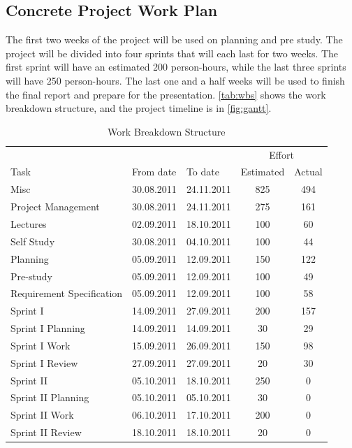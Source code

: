 \subsection{Concrete Project Work Plan}
The first two weeks of the project will be used on planning and pre study.
The project will be divided into four sprints that will each last for two weeks.
The first sprint will have an estimated 200 person-hours, while the last three
sprints will have 250 person-hours. The last one and a half weeks will be used to finish
the final report and prepare for the presentation. \autoref{tab:wbs} shows the
work breakdown structure, and the project timeline is in \autoref{fig:gantt}.

\begin{table}[!htb] \footnotesize \center
\caption{Work Breakdown Structure\label{tab:wbs}}
\begin{tabular}{l l l c c}
	\toprule
	& & & \multicolumn{2}{c}{Effort} \\
	\cmidrule(r){4-5}
	Task & From date & To date & Estimated & Actual  \\
	\midrule
	Misc & 30.08.2011 & 24.11.2011 & 825 & 494  \\
	\midrule
	Project Management & 30.08.2011 & 24.11.2011 & 275 &161 \\
	Lectures & 02.09.2011 & 18.10.2011 & 100 & 60 \\
	Self Study & 30.08.2011 & 04.10.2011 & 100 & 44 \\
	Planning & 05.09.2011 & 12.09.2011 & 150 & 122 \\
	Pre-study & 05.09.2011 & 12.09.2011 & 100 & 49 \\
	Requirement Specification & 05.09.2011 & 12.09.2011 & 100 & 58 \\
	\midrule
	Sprint I & 14.09.2011 & 27.09.2011 & 200 & 157 \\
	\midrule
	Sprint I Planning & 14.09.2011 & 14.09.2011 & 30 & 29 \\
	Sprint I Work & 15.09.2011 & 26.09.2011 & 150 & 98 \\
	Sprint I Review & 27.09.2011 & 27.09.2011 & 20 & 30 \\
	\midrule
	Sprint II & 05.10.2011 & 18.10.2011 & 250 & 0 \\
	\midrule
	Sprint II Planning & 05.10.2011 & 05.10.2011 & 30 & 0 \\
	Sprint II Work & 06.10.2011 & 17.10.2011 & 200 & 0 \\
	Sprint II Review & 18.10.2011 & 18.10.2011 & 20 & 0 \\

\end{tabular}
\end{table}
